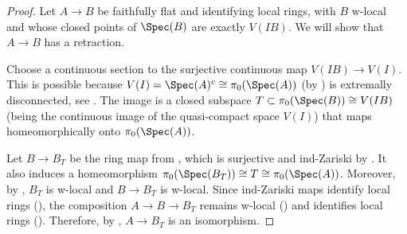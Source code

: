 \begin{proof}
  Let $A \to B$ be faithfully flat and identifying local rings, with \(B\) w-local and whose closed points of \(\Spec (B)\) are exactly \(V(IB)\). We will show that $A \to B$ has a retraction.


  Choose a continuous section to the surjective continuous map $V(IB) \to V(I)$. This is possible because $V(I) = \Spec(A)^c \cong \pi_0(\Spec(A))$ (by ) is extremally disconnected, see . The image is a closed subspace $T \subset \pi_0(\Spec(B)) \cong V(IB)$ (being the continuous image of the quasi-compact space $V(I)$) that maps homeomorphically onto $\pi_0(\Spec(A))$. 
  
  Let $B \to B_T$ be the ring map from , which is surjective and ind-Zariski by . It also induces a homeomorphism $\pi_0(\Spec(B_T)) \cong T \cong \pi_0(\Spec(A))$.
  Moreover, by , $B_T$ is w-local and $B \to B_T$ is w-local. Since ind-Zariski maps identify local rings (), the composition $A \to B \to B_T$ remains w-local () and identifies local rings (). Therefore, by , $A \to B_T$ is an isomorphism.
\end{proof}

